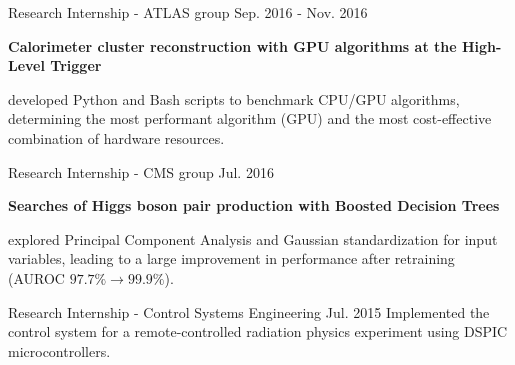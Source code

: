 \begin{cventries}
    {Research Internship - ATLAS group}
    {}
    {Sep. 2016 - Nov. 2016}
    {   
        \textbf{Calorimeter cluster reconstruction with GPU algorithms at the High-Level Trigger}\vspace{14pt}
        \begin{cvitems}
            \item {developed Python and Bash scripts to benchmark CPU/GPU algorithms, determining the most performant algorithm (GPU) and the most cost-effective combination of hardware resources.}
        \end{cvitems}
    }

    {Research Internship - CMS group}
    {}
    {Jul. 2016}
    {
        \textbf{Searches of Higgs boson pair production with Boosted Decision Trees}\vspace{14pt}
        \begin{cvitems}
            \item {explored Principal Component Analysis and Gaussian standardization for input variables, leading to a large improvement in performance after retraining (AUROC $97.7\% \to 99.9\%$).}
        \end{cvitems}
    }

    {Research Internship - Control Systems Engineering}
    {}
    {Jul. 2015}
    {Implemented the control system for a remote-controlled radiation physics experiment using DSPIC microcontrollers.}

\end{cventries}